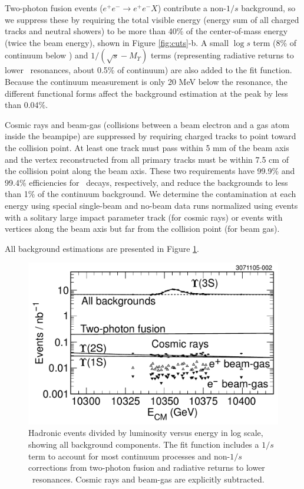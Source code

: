 \documentclass[aps,prl,twocolumn,superscriptaddress,showpacs]{revtex4}
\begin{document}
Two-photon fusion events ($e^+e^- \to e^+e^- X$) contribute a
non-$1/s$ background, so we suppress these by requiring the total
visible energy (energy sum of all charged tracks and neutral showers)
to be more than 40\% of the center-of-mass energy (twice the beam
energy), shown in Figure \ref{fig:cuts}-b.  A small $\log s$ term (8\%
of continuum below \us) and $1/(\sqrt{s}-M_\Upsilon)$ terms
(representing radiative returns to lower \ups\ resonances, about 0.5\%
of continuum) are also added to the fit function.  Because the
continuum measurement is only 20 MeV below the resonance, the
different functional forms affect the background estimation at the
peak by less than 0.04\%.

Cosmic rays and beam-gas (collisions between a beam electron and a gas
atom inside the beampipe) are suppressed by requiring charged tracks
to point toward the collision point.  At least one track must pass
within 5 mm of the beam axis and the vertex reconstructed from all
primary tracks must be within 7.5 cm of the collision point along the
beam axis.  These two requirements have 99.9\% and 99.4\% efficiencies
for \ups\ decays, respectively, and reduce the backgrounds to less
than 1\% of the continuum background.  We determine the contamination
at each energy using special single-beam and no-beam data runs
normalized using events with a solitary large impact parameter track
(for cosmic rays) or events with vertices along the beam axis but far
from the collision point (for beam gas).

All background estimations are presented in Figure
\ref{fig:backgrounds}.

\begin{figure}
  \includegraphics[width=\linewidth]{backgrounds}
  \caption{\label{fig:backgrounds} Hadronic events divided by
  luminosity versus energy in log scale, showing all background
  components.  The fit function includes a $1/s$ term to account for
  most continuum processes and non-$1/s$ corrections from two-photon
  fusion and radiative returns to lower \ups\ resonances.  Cosmic rays
  and beam-gas are explicitly subtracted.}
\end{figure}
\end{document}
